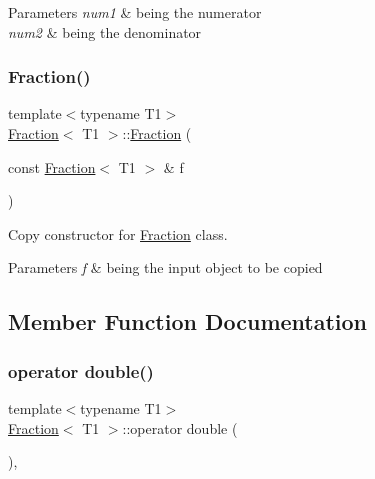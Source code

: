 \begin{DoxyParams}{Parameters}
{\em num1} & being the numerator \\
\hline
{\em num2} & being the denominator \\
\hline
\end{DoxyParams}
\mbox{\label{class_fraction_af8e21ec54ed1bbbb929cdad09b8d67e1}} 
\subsubsection{\texorpdfstring{Fraction()}{Fraction()}\hspace{0.1cm}{\footnotesize\ttfamily [2/2]}}
{\footnotesize\ttfamily template$<$typename T1$>$ \\
\mbox{\hyperlink{class_fraction}{Fraction}}$<$ T1 $>$\+::\mbox{\hyperlink{class_fraction}{Fraction}} (\begin{DoxyParamCaption}\item[{const \mbox{\hyperlink{class_fraction}{Fraction}}$<$ T1 $>$ \&}]{f }\end{DoxyParamCaption})}



Copy constructor for \mbox{\hyperlink{class_fraction}{Fraction}} class. 


\begin{DoxyParams}{Parameters}
{\em f} & being the input object to be copied \\
\hline
\end{DoxyParams}


\subsection{Member Function Documentation}
\mbox{\label{class_fraction_ae5eacb8f904e3f988413b2a6985fe500}} 
\subsubsection{\texorpdfstring{operator double()}{operator double()}}
{\footnotesize\ttfamily template$<$typename T1$>$ \\
\mbox{\hyperlink{class_fraction}{Fraction}}$<$ T1 $>$\+::operator double (\begin{DoxyParamCaption}{ }\end{DoxyParamCaption})\hspace{0.3cm}{\ttfamily [inline]}, {\ttfamily [explicit]}}



